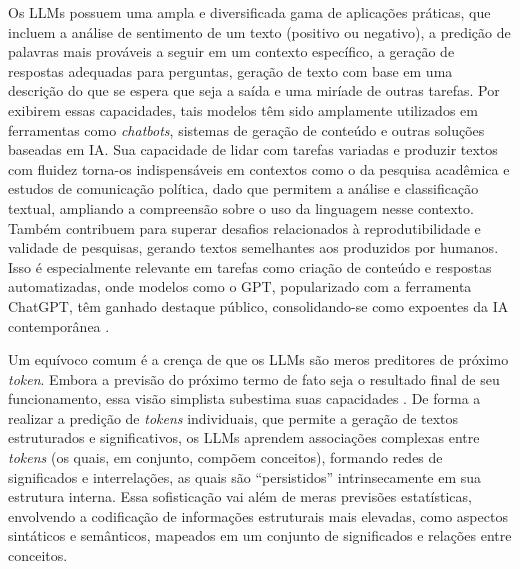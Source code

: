 Os \ac{LLM}s possuem uma ampla e diversificada gama de aplicações práticas, que incluem a análise de sentimento de um texto (positivo ou negativo), a predição de palavras mais prováveis a seguir em um contexto específico, a geração de respostas adequadas para perguntas, geração de texto com base em uma descrição do que se espera que seja a saída e uma miríade de outras tarefas. Por exibirem essas capacidades, tais modelos têm sido amplamente utilizados em ferramentas como \textit{chatbots}, sistemas de geração de conteúdo e outras soluções baseadas em \ac{IA}. Sua capacidade de lidar com tarefas variadas e produzir textos com fluidez torna-os indispensáveis em contextos como o da pesquisa acadêmica e estudos de comunicação política, dado que permitem a análise e classificação textual, ampliando a compreensão sobre o uso da linguagem nesse contexto. Também contribuem para superar desafios relacionados à reprodutibilidade e validade de pesquisas, gerando textos semelhantes aos produzidos por humanos. Isso é especialmente relevante em tarefas como criação de conteúdo e respostas automatizadas, onde modelos como o \ac{GPT}, popularizado com a ferramenta ChatGPT, têm ganhado destaque público, consolidando-se como expoentes da \ac{IA} contemporânea \cite{LLMs:3,LLMs:4}.

Um equívoco comum é a crença de que os \ac{LLM}s são meros preditores de próximo \textit{token}. Embora a previsão do próximo termo de fato seja o resultado final de seu funcionamento, essa visão simplista subestima suas capacidades \cite{LLMs:2}. De forma a realizar a predição de \textit{tokens} individuais, que permite a geração de textos estruturados e significativos, os \ac{LLM}s aprendem associações complexas entre \textit{tokens} (os quais, em conjunto, compõem conceitos), formando redes de significados e interrelações, as quais são ``persistidos'' intrinsecamente em sua estrutura interna. Essa sofisticação vai além de meras previsões estatísticas, envolvendo a codificação de informações estruturais mais elevadas, como aspectos sintáticos e semânticos, mapeados em um conjunto de significados e relações entre conceitos.


